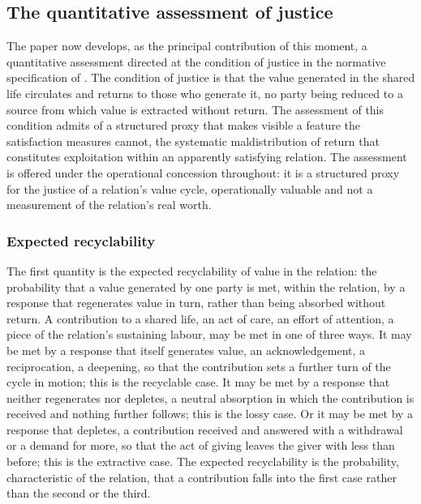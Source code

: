 

\subsection{The quantitative assessment of justice}
\label{p11:sec:ev-justice}

The paper now develops, as the principal contribution of this moment, a quantitative assessment directed at the condition of justice in the normative specification of . The condition of justice is that the value generated in the shared life circulates and returns to those who generate it, no party being reduced to a source from which value is extracted without return. The assessment of this condition admits of a structured proxy that makes visible a feature the satisfaction measures cannot, the systematic maldistribution of return that constitutes exploitation within an apparently satisfying relation. The assessment is offered under the operational concession throughout: it is a structured proxy for the justice of a relation's value cycle, operationally valuable and not a measurement of the relation's real worth.

\subsubsection{Expected recyclability}
\label{p11:sec:ev-recyc}

The first quantity is the expected recyclability of value in the relation: the probability that a value generated by one party is met, within the relation, by a response that regenerates value in turn, rather than being absorbed without return. A contribution to a shared life, an act of care, an effort of attention, a piece of the relation's sustaining labour, may be met in one of three ways. It may be met by a response that itself generates value, an acknowledgement, a reciprocation, a deepening, so that the contribution sets a further turn of the cycle in motion; this is the recyclable case. It may be met by a response that neither regenerates nor depletes, a neutral absorption in which the contribution is received and nothing further follows; this is the lossy case. Or it may be met by a response that depletes, a contribution received and answered with a withdrawal or a demand for more, so that the act of giving leaves the giver with less than before; this is the extractive case. The expected recyclability is the probability, characteristic of the relation, that a contribution falls into the first case rather than the second or the third.

